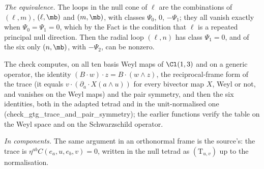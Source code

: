 \emph{The equivalence.} The loops in the null cone of $\ell$ are the combinations of $(\ell, m)$, $(\ell, \mb)$ and $(m, \mb)$, with classes $\Psi_{0}$, $0$, $-\Psi_{1}$; they all vanish exactly when $\Psi_{0} = \Psi_{1} = 0$, which by the Fact is the condition that $\ell$ is a repeated principal null direction. Then the radial loop $(\ell, n)$ has class $\Psi_{1} = 0$, and of the six only $(n, \mb)$, with $-\Psi_{2}$, can be nonzero.

The check computes, on all ten basis Weyl maps of $\Cl(1,3)$ and on a generic operator, the identity $(B\cdot w)\cdot z = B\cdot(w \wedge z)$, the reciprocal-frame form of the trace (it equals $v\cdot(\partial_{a}\cdot X(a \wedge u))$ for every bivector map $X$, Weyl or not, and vanishes on the Weyl maps) and the pair symmetry, and then the six identities, both in the adapted tetrad and in the unit-normalised one (check\_gtg\_trace\_and\_pair\_symmetry); the earlier functions verify the table on the Weyl space and on the Schwarzschild operator.

\emph{In components.} The same argument in an orthonormal frame is the source's: the trace is $\eta^{ab}C(e_{a}, u, e_{b}, v) = 0$, written in the null tetrad as $(\mathrm{T}_{u,v})$ up to the normalisation.
